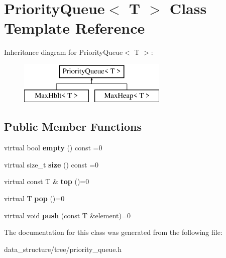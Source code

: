 \hypertarget{classPriorityQueue}{}\section{Priority\+Queue$<$ T $>$ Class Template Reference}
\label{classPriorityQueue}
Inheritance diagram for Priority\+Queue$<$ T $>$\+:\begin{figure}[H]
\begin{center}
\leavevmode
\includegraphics[height=2.000000cm]{classPriorityQueue}
\end{center}
\end{figure}
\subsection*{Public Member Functions}
\begin{DoxyCompactItemize}
\item 
\mbox{\label{classPriorityQueue_a8865739774308504e4b1d81c7b385386}} 
virtual bool {\bfseries empty} () const =0
\item 
\mbox{\label{classPriorityQueue_a6ec9a3eaa9e27203bc0d1c5d77f5312a}} 
virtual size\+\_\+t {\bfseries size} () const =0
\item 
\mbox{\label{classPriorityQueue_af3a08e3e21f1ec7abc8f2bb2a4960ee4}} 
virtual const T \& {\bfseries top} ()=0
\item 
\mbox{\label{classPriorityQueue_ad34ccb15bd46775413a8647ccb1af081}} 
virtual T {\bfseries pop} ()=0
\item 
\mbox{\label{classPriorityQueue_abfa3615ae45c98a2744b23b895fa7df1}} 
virtual void {\bfseries push} (const T \&element)=0
\end{DoxyCompactItemize}


The documentation for this class was generated from the following file\+:\begin{DoxyCompactItemize}
\item 
data\+\_\+structure/tree/priority\+\_\+queue.\+h\end{DoxyCompactItemize}
